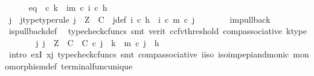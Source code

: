 \begin{isabellebody}
\ \ \ \ \isamarkupfalse%
\ eq{\isacharcolon}{\kern0pt}\ {\isachardoublequoteopen}{\isasymt}\ {\isasymcirc}\isactrlsub c\ k\ {\isacharequal}{\kern0pt}\ {\isacharparenleft}{\kern0pt}{\isasymchi}im\ {\isasymcirc}\isactrlsub c\ i{\isacharparenright}{\kern0pt}\ {\isasymcirc}\isactrlsub c\ h{\isachardoublequoteclose}\isanewline
\ \ \ \ \isamarkupfalse%
\ \isamarkupfalse%
\ j\ \ j{\isacharunderscore}{\kern0pt}type{\isacharbrackleft}{\kern0pt}type{\isacharunderscore}{\kern0pt}rule{\isacharbrackright}{\kern0pt}{\isacharcolon}{\kern0pt}\ {\isachardoublequoteopen}j\ {\isacharcolon}{\kern0pt}\ Z\ {\isasymrightarrow}\ C{\isachardoublequoteclose}\ \ j{\isacharunderscore}{\kern0pt}def{\isacharcolon}{\kern0pt}\ {\isachardoublequoteopen}i\ {\isasymcirc}\isactrlsub c\ h\ {\isacharequal}{\kern0pt}\ {\isacharparenleft}{\kern0pt}i\ {\isasymcirc}\isactrlsub c\ m{\isacharparenright}{\kern0pt}\ {\isasymcirc}\isactrlsub c\ j{\isachardoublequoteclose}\isanewline
\ \ \ \ \ \ \isamarkupfalse%
\ {\isasymchi}im{\isacharunderscore}{\kern0pt}pullback\ \isamarkupfalse%
\ is{\isacharunderscore}{\kern0pt}pullback{\isacharunderscore}{\kern0pt}def\ \isamarkupfalse%
\ {\isacharparenleft}{\kern0pt}typecheck{\isacharunderscore}{\kern0pt}cfuncs{\isacharcomma}{\kern0pt}\ smt\ {\isacharparenleft}{\kern0pt}verit{\isacharcomma}{\kern0pt}\ ccfv{\isacharunderscore}{\kern0pt}threshold{\isacharparenright}{\kern0pt}\ comp{\isacharunderscore}{\kern0pt}associative{}\ k{\isacharunderscore}{\kern0pt}type{\isacharparenright}{\kern0pt}\isanewline
\ \ \ \ \isamarkupfalse%
\ \isamarkupfalse%
\ {\isachardoublequoteopen}{\isasymexists}j{\isachardot}{\kern0pt}\ j\ {\isacharcolon}{\kern0pt}\ Z\ {\isasymrightarrow}\ C\ {\isasymand}\ {\isasymbeta}\isactrlbsub C\isactrlesub \ {\isasymcirc}\isactrlsub c\ j\ {\isacharequal}{\kern0pt}\ k\ {\isasymand}\ m\ {\isasymcirc}\isactrlsub c\ j\ {\isacharequal}{\kern0pt}\ h{\isachardoublequoteclose}\isanewline
\ \ \ \ \ \ \isamarkupfalse%
\ {\isacharparenleft}{\kern0pt}intro\ exI{\isacharbrackleft}{\kern0pt}\ x{\isacharequal}{\kern0pt}j{\isacharbrackright}{\kern0pt}{\isacharcomma}{\kern0pt}\ typecheck{\isacharunderscore}{\kern0pt}cfuncs{\isacharcomma}{\kern0pt}\ smt\ comp{\isacharunderscore}{\kern0pt}associative{}\ i{\isacharunderscore}{\kern0pt}iso\ iso{\isacharunderscore}{\kern0pt}imp{\isacharunderscore}{\kern0pt}epi{\isacharunderscore}{\kern0pt}and{\isacharunderscore}{\kern0pt}monic\ monomorphism{\isacharunderscore}{\kern0pt}def{}\ terminal{\isacharunderscore}{\kern0pt}func{\isacharunderscore}{\kern0pt}unique{\isacharparenright}{\kern0pt}\isanewline

\end{isabellebody}
